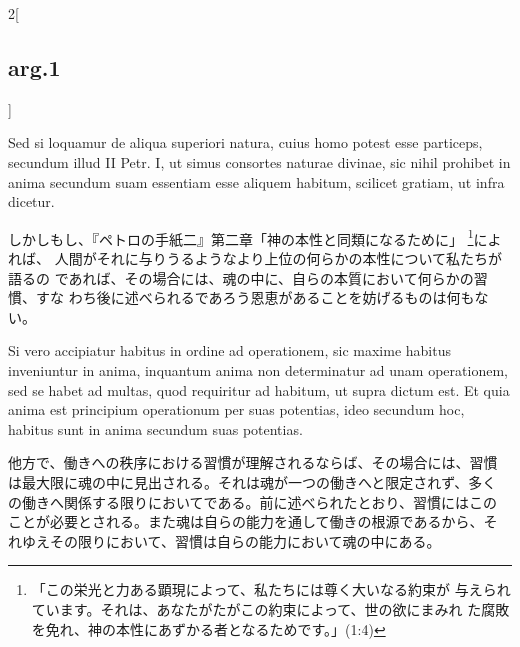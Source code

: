 \documentclass[paper=a4paper,fontsize=10pt,jafontsize=9pt,titlepage]{jlreq}
\begin{document}
\begin{paracol}{2}[\subsection{arg.1}]
\switchcolumn*

Sed si
loquamur de aliqua superiori natura, cuius homo potest esse particeps,
secundum illud II Petr. I, ut simus consortes naturae divinae, sic
nihil prohibet in anima secundum suam essentiam esse aliquem habitum,
scilicet gratiam, ut infra dicetur.

\switchcolumn

しかしもし、『ペトロの手紙二』第二章「神の本性と同類になるために」
\footnote{「この栄光と力ある顕現によって、私たちには尊く大いなる約束が
与えられています。それは、あなたがたがこの約束によって、世の欲にまみれ
た腐敗を免れ、神の本性にあずかる者となるためです。」(1:4) }によれば、
人間がそれに与りうるようなより上位の何らかの本性について私たちが語るの
であれば、その場合には、魂の中に、自らの本質において何らかの習慣、すな
わち後に述べられるであろう恩恵があることを妨げるものは何もない。

\switchcolumn*

Si vero accipiatur habitus in
ordine ad operationem, sic maxime habitus inveniuntur in anima,
inquantum anima non determinatur ad unam operationem, sed se habet ad
multas, quod requiritur ad habitum, ut supra dictum est. Et quia anima
est principium operationum per suas potentias, ideo secundum hoc,
habitus sunt in anima secundum suas potentias.

\switchcolumn

他方で、働きへの秩序における習慣が理解されるならば、その場合には、習慣
は最大限に魂の中に見出される。それは魂が一つの働きへと限定されず、多く
の働きへ関係する限りにおいてである。前に述べられたとおり、習慣にはこの
ことが必要とされる。また魂は自らの能力を通して働きの根源であるから、そ
れゆえその限りにおいて、習慣は自らの能力において魂の中にある。

\end{paracol}

\schema
{
}
{
    \schema
    {
    }
    {
    }
}
\end{document}
